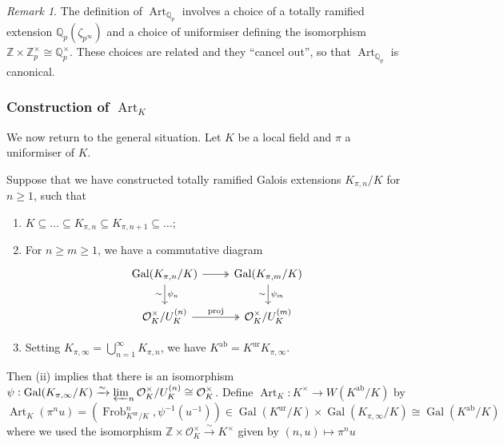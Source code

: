 \documentclass[11pt]{article}
\theoremstyle{definition}
\theoremstyle{plain}
\theoremstyle{remark}
\newtheorem*{remark}{Remark}
\DeclareMathOperator{\Gal}{Gal}
\DeclareMathOperator{\proj}{proj}
\DeclareMathOperator{\Frob}{Frob}
\DeclareMathOperator{\Art}{Art}
\newcommand{\ZZ}{\mathbb{Z}}
\newcommand{\QQ}{\mathbb{Q}}
\newcommand{\cO}{\mathcal{O}}
\newcommand{\ab}{\mathrm{ab}}
\newcommand{\ur}{\mathrm{ur}}
\begin{document}
\begin{remark}
    The definition of $\Art_{\QQ_p}$ involves a choice of a totally ramified extension $\QQ_p(\zeta_{p^\infty})$ and a choice of uniformiser defining the isomorphism $\ZZ \times \ZZ_p^\times \cong \QQ_p^\times$. These choices are related and they ``cancel out'', so that $\Art_{\QQ_p}$ is canonical.
\end{remark}

\subsubsection*{Construction of $\Art_K$}
We now return to the general situation. Let $K$ be a local field and $\pi$ a uniformiser of $K$.

Suppose that we have constructed totally ramified Galois extensions $K_{\pi, n}/K$ for $n \ge 1$, such that
\begin{enumerate}
    \item $K \subseteq \ldots \subseteq K_{\pi, n} \subseteq K_{\pi, n+1} \subseteq \ldots$;

    \item For $n \ge m \ge 1$, we have a commutative diagram
        \begin{equation*}
        \begin{tikzcd}
            \Gal(K_{\pi,n}/K) \arrow[r, twoheadrightarrow] \arrow[d, "\psi_n", "\sim"'] & \Gal(K_{\pi,m}/K) \arrow[d, "\psi_m", "\sim"']\\
            \cO_K^\times / U_K^{(n)} \arrow[r, twoheadrightarrow, "\proj"] & \cO_K^\times / U_K^{(m)}
        \end{tikzcd}
        \end{equation*}

    \item Setting $K_{\pi, \infty} = \bigcup_{n=1}^\infty K_{\pi,n}$, we have $K^\ab = K^\ur K_{\pi, \infty}$.
\end{enumerate}
Then (ii) implies that there is an isomorphism $\psi : \Gal(K_{\pi,\infty}/K) \xrightarrow{\sim} \varprojlim_{n} \cO_K^\times / U_K^{(n)} \cong \cO_K^\times$. Define $\Art_K : K^\times \to W(K^\ab / K)$ by
\begin{equation*}
    \Art_K(\pi^n u) = (\Frob_{K^\ur/K}^n, \psi^{-1}(u^{-1})) \in \Gal(K^\ur / K) \times \Gal(K_{\pi,\infty}/K) \cong \Gal(K^\ab/K)
\end{equation*}
where we used the isomorphism $\ZZ \times \cO_K^\times \xrightarrow{\sim} K^\times$ given by $(n, u) \mapsto \pi^n u$
\end{document}
